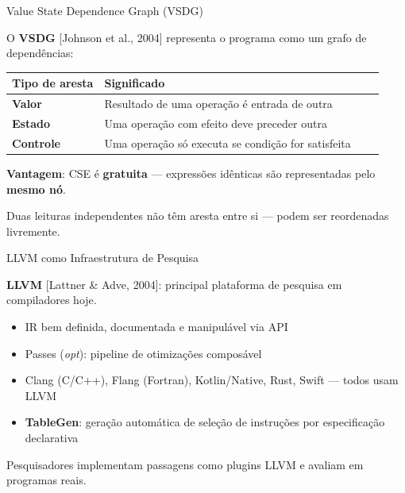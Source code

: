 \begin{frame}{Value State Dependence Graph (VSDG)}

    O \textbf{VSDG} {[}Johnson et al., 2004{]} representa o programa como um
    grafo de dependências:

    \begin{table}
        \begin{tabular}{l l l l}
            \hline
            Tipo de aresta & Significado \\
            \hline
            \textbf{Valor} & Resultado de uma operação é entrada de outra \\
            \textbf{Estado} & Uma operação com efeito deve preceder outra \\
            \textbf{Controle} & Uma operação só executa se condição for
            satisfeita \\
            \hline
        \end{tabular}
    \end{table}

    \textbf{Vantagem}: CSE é \textbf{gratuita} --- expressões idênticas são
    representadas pelo \textbf{mesmo nó}.

    Duas leituras independentes não têm aresta entre si --- podem ser
    reordenadas livremente.
\end{frame}

\begin{frame}{LLVM como Infraestrutura de Pesquisa}

    \textbf{LLVM} {[}Lattner \& Adve, 2004{]}: principal plataforma de
    pesquisa em compiladores hoje.

    \begin{itemize}

        \item
        IR bem definida, documentada e manipulável via API
        \item
        Passes (\emph{opt}): pipeline de otimizações composável
        \item
        Clang (C/C++), Flang (Fortran), Kotlin/Native, Rust, Swift --- todos
        usam LLVM
        \item
        \textbf{TableGen}: geração automática de seleção de instruções por
        especificação declarativa
    \end{itemize}

    Pesquisadores implementam passagens como plugins LLVM e avaliam em
    programas reais.
\end{frame}


